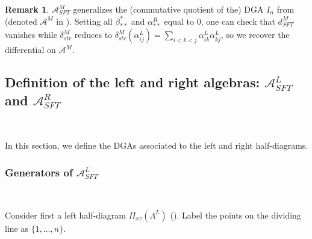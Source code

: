 \documentclass[a4paper,final, reqno]{amsart}
\theoremstyle{plain}
\theoremstyle{definition}
\newtheorem{Rem}[Th]{Remark}
\newcommand{\A}{\mathcal{A}}
\begin{document}
	
	\begin{Rem}
		$\A^M_{SFT}$ generalizes the (commutative quotient of the) DGA $I_n$ from \cite{sivek} (denoted $\A^M$ in ). Setting all $\beta_{**}^*$ and $\alpha_{**}^R$ equal to $0$, one can check that $d_{SFT}^M$ vanishes while $\delta_{str}^M$ reduces to $\delta_{str}^M(\alpha_{ij}^L) = \sum_{i<k<j} \alpha_{ik}^L\alpha_{kj}^L$, so we recover the differential on $\A^M$.
	\end{Rem}
	
	
	
	\subsection{Definition of the left and right algebras: $\A^L_{SFT}$ and $\A^R_{SFT}$}\label{subsec:ALAR}\-\
	
	In this section, we define the DGAs associated to the left and right half-diagrams. 
	
	\subsubsection{Generators of $\A^L_{SFT}$}\-\
	
	Consider first a left half-diagram $\Pi_{xz}(\Lambda^L)$ (). Label the points on the dividing line as $\{ 1, \dots, n \}$. 
	
\end{document}
